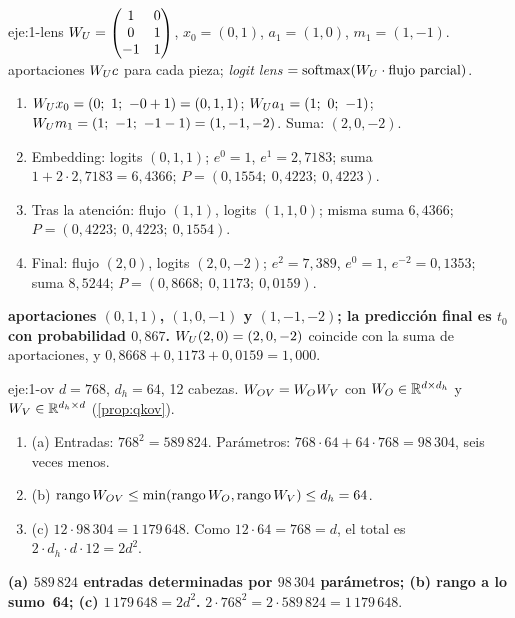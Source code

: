 \begin{solucion}{eje:1-lens}
\datos $W_{U}=\begin{pmatrix}1&0\\0&1\\-1&1\end{pmatrix}$, $x_0=(0,1)$, $a_1=(1,0)$, $m_1=(1,-1)$.
\planteamiento aportaciones $W_{U} c$ para cada pieza; \emph{logit lens} $=\operatorname{softmax}(W_{U}\cdot\text{flujo parcial})$.
\pasos
\begin{enumerate}[label=\arabic*.]
  \item $\WU x_0=(0;\allowbreak\ 1;\allowbreak\ -0+1)=(0,1,1)$; $W_{U} a_1=(1;\allowbreak\ 0;\allowbreak\ -1)$; $\WU m_1=(1;\allowbreak\ -1;\allowbreak\ -1-1)=(1,-1,-2)$. Suma: $(2,0,-2)$.
  \item Embedding: logits $(0,1,1)$; $e^{0}=1$, $e^{1}=2{,}7183$; suma $1+2\cdot 2{,}7183=6{,}4366$; $P=(0{,}1554;\allowbreak\ 0{,}4223;\allowbreak\ 0{,}4223)$.
  \item Tras la atención: flujo $(1,1)$, logits $(1,1,0)$; misma suma $6{,}4366$; $P=(0{,}4223;\allowbreak\ 0{,}4223;\allowbreak\ 0{,}1554)$.
  \item Final: flujo $(2,0)$, logits $(2,0,-2)$; $e^{2}=7{,}389$, $e^{0}=1$, $e^{-2}=0{,}1353$; suma $8{,}5244$; $P=(0{,}8668;\allowbreak\ 0{,}1173;\allowbreak\ 0{,}0159)$.
\end{enumerate}
\resultado \textbf{aportaciones $(0,1,1)$, $(1,0,-1)$ y $(1,-1,-2)$; la predicción final es $t_0$ con probabilidad $0{,}867$.}
\comprobacion $W_{U}(2,0)=(2,0,-2)$ coincide con la suma de aportaciones, y $0{,}8668+0{,}1173+0{,}0159=1{,}000$.
\end{solucion}

\begin{solucion}{eje:1-ov}
\datos $d=768$, $d_h=64$, 12 cabezas.
\planteamiento $W_{OV}=W_OW_V$ con $W_O\in\mathbb{R}^{d\times d_h}$ y $W_V\in\mathbb{R}^{d_h\times d}$ (\cref{prop:qkov}).
\pasos
\begin{enumerate}[label=\arabic*.]
  \item (a) Entradas: $768^{2}=589\,824$. Parámetros: $768\cdot 64+64\cdot 768=98\,304$, seis veces menos.
  \item (b) $\operatorname{rango}W_{OV}\le\min(\operatorname{rango} W_O,\operatorname{rango} W_V)\le d_h=64$.
  \item (c) $12\cdot 98\,304=1\,179\,648$. Como $12\cdot 64=768=d$, el total es $2\cdot d_h\cdot d\cdot 12=2d^{2}$.
\end{enumerate}
\resultado \textbf{(a) $589\,824$ entradas determinadas por $98\,304$ parámetros; (b) rango a lo sumo~64; (c) $1\,179\,648=2d^{2}$.}
\comprobacion $2\cdot 768^{2}=2\cdot 589\,824=1\,179\,648$.
\end{solucion}

